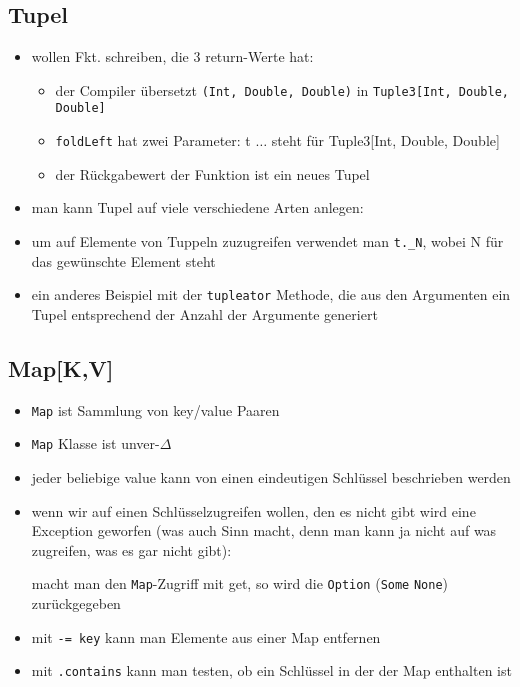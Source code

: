 \subsection{Tupel}
\begin{itemize}
  \item wollen Fkt. schreiben, die 3 return-Werte hat:
  
  
  
  \begin{itemize}
    \item der Compiler übersetzt \texttt{(Int, Double, Double)} in
    \texttt{Tuple3[Int, Double, Double]}
    \item \texttt{foldLeft} hat zwei Parameter: t $\ldots$ steht für 
    Tuple3[Int, Double, Double]
    \item der Rückgabewert der Funktion ist ein neues Tupel
  \end{itemize}
  \item man kann Tupel auf viele verschiedene Arten anlegen:
  
  
  
  \item um auf Elemente von Tuppeln zuzugreifen verwendet man
  \texttt{t.\_N}, wobei N für das gewünschte Element steht
  \item ein anderes Beispiel mit der \texttt{tupleator} Methode, die aus den
  Argumenten ein Tupel entsprechend der Anzahl der Argumente generiert
  
  
\end{itemize}


\subsection{Map[K,V]}
\begin{itemize}
  \item \texttt{Map} ist Sammlung von key/value Paaren
  \item \texttt{Map} Klasse ist unver-$\Delta$
  \item jeder beliebige value kann von einen eindeutigen Schlüssel
  beschrieben werden
    
  \item wenn wir auf einen Schlüsselzugreifen wollen, den es nicht
  gibt wird eine Exception geworfen (was auch Sinn macht, denn man
  kann ja nicht auf was zugreifen, was es gar nicht gibt):
 
  

  macht man den \texttt{Map}-Zugriff mit get, so wird die 
  \texttt{Option} (\texttt{Some} \oder \texttt{None}) zurückgegeben
  \item mit \texttt{-= key} kann man Elemente aus einer Map entfernen
  \item mit \texttt{.contains} kann man testen, ob ein Schlüssel in der
  der Map enthalten ist
\end{itemize}


